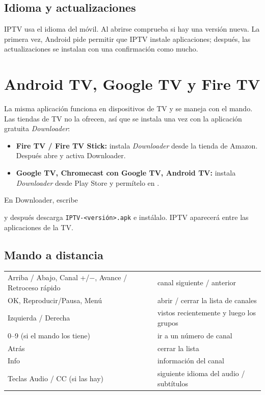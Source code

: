 \subsection{Idioma y actualizaciones}
IPTV usa el idioma del móvil. Al abrirse comprueba si hay una versión nueva.
La primera vez, Android pide permitir que IPTV instale aplicaciones; después,
las actualizaciones se instalan con una confirmación como mucho.

\section{Android TV, Google TV y Fire TV}

La misma aplicación funciona en dispositivos de TV y se maneja con el mando.
Las tiendas de TV no la ofrecen, así que se instala una vez con la aplicación
gratuita \emph{Downloader}:

\begin{itemize}
  \item \textbf{Fire TV / Fire TV Stick:} instala \emph{Downloader} desde la
        tienda de Amazon. Después abre  y activa
        Downloader.
  \item \textbf{Google TV, Chromecast con Google TV, Android TV:} instala
        \emph{Downloader} desde Play Store y permítelo en
        .
\end{itemize}
En Downloader, escribe
\begin{center}
  \download
\end{center}
y después descarga \texttt{IPTV-\textless versión\textgreater.apk} e
instálalo. IPTV aparecerá entre las aplicaciones de la TV.

\subsection{Mando a distancia}
\begin{xltabular}{\linewidth}{@{}KX@{}}
Arriba / Abajo, Canal +/$-$, Avance / Retroceso rápido & canal siguiente / anterior \\
OK, Reproducir/Pausa, Menú & abrir / cerrar la lista de canales \\
Izquierda / Derecha & vistos recientemente y luego los grupos \\
0--9 (si el mando los tiene) & ir a un número de canal \\
Atrás & cerrar la lista \\
Info & información del canal \\
Teclas Audio / CC (si las hay) & siguiente idioma del audio / subtítulos \\
\bottomrule
\end{xltabular}

